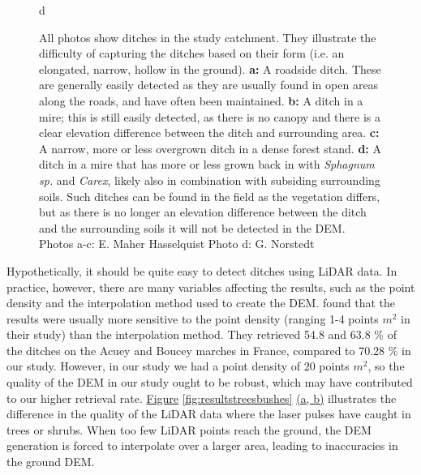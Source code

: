 \documentclass[11pt, review]{elsarticle} %
\begin{document}
\begin{figure} [H]
    d{
        }
    \caption{All photos show ditches in the study catchment. They illustrate the difficulty of capturing the ditches based on their form (i.e. an elongated, narrow, hollow in the ground). \textbf{a: }A roadside ditch. These are generally easily detected as they are usually found in open areas along the roads, and have often been maintained. \textbf{b: }A ditch in a mire; this is still easily detected, as there is no canopy and there is a clear elevation difference between the ditch and surrounding area. \textbf{c: }A narrow, more or less  overgrown ditch in a dense forest stand. \textbf{d: }A ditch in a mire that has more or less grown back in with \textit{Sphagnum sp.} and \textit{Carex}, likely also in combination with subsiding surrounding soils. Such ditches can be found in the field as the vegetation differs, but as there is no longer an elevation difference between the ditch and the surrounding soils it will not be detected in the DEM. Photos a-c: E. Maher Hasselquist  Photo d: G. Norstedt}
    \label{fig:ditchpictures}
\end{figure}

Hypothetically, it should be quite easy to detect ditches using LiDAR data. In practice, however, there are many variables affecting the results, such as the point density and the interpolation method used to create the DEM. \citet{rapinel} found that the results were usually more sensitive to the point density (ranging 1-4 points $m^{2}$ in their study) than the interpolation method. They retrieved 54.8 and 63.8 \% of the ditches on the Acuey and Boucey marches in France, compared to 70.28 \% in our study. However, in our study we had a point density of 20 points $m^{2}$, so the quality of the DEM in our study ought to be robust, which may have contributed to our higher retrieval rate. \hyperref[fig:resultstreesbushes]{Figure} \ref{fig:resultstreesbushes} \hyperref[fig:resultstreesbushes]{(a, b)} illustrates the difference in the quality of the LiDAR data where the laser pulses have caught in trees or shrubs. When too few LiDAR points reach the ground, the DEM generation is forced to interpolate over a larger area, leading to inaccuracies in the ground DEM.
\end{document}
